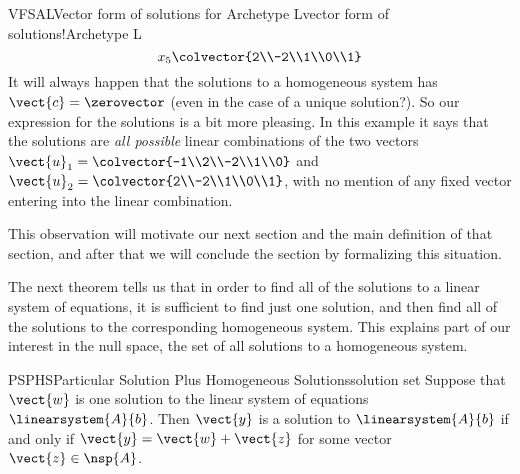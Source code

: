 \begin{example}{VFSAL}{Vector form of solutions for Archetype L}{vector form of solutions!Archetype L}
\begin{equation*}
x_5\colvector{2\\-2\\1\\0\\1}
\end{equation*}
%
It will always happen that the solutions to a homogeneous system has $\vect{c}=\zerovector$ (even in the case of a unique solution?).  So our expression for the solutions is a bit more pleasing.  In this example it says that the solutions are {\em all possible} linear combinations of the two vectors $\vect{u}_1=\colvector{-1\\2\\-2\\1\\0}$ and $\vect{u}_2=\colvector{2\\-2\\1\\0\\1}$, with no mention of any fixed vector entering into the linear combination.\par
%
This observation will motivate our next section and the main definition of that section, and after that we will conclude the section by formalizing this situation.
%
\end{example}
%
%
The next theorem tells us that in order to find all of the solutions to a linear system of equations, it is sufficient to find just one solution, and then find all of the solutions to the corresponding homogeneous system.  This explains part of our interest in the null space, the set of all solutions to a homogeneous system.
%
\begin{theorem}{PSPHS}{Particular Solution Plus Homogeneous Solutions}{solution set}
Suppose that $\vect{w}$ is one solution to the linear system of equations $\linearsystem{A}{b}$.  Then $\vect{y}$ is a solution to $\linearsystem{A}{b}$ if and only if $\vect{y}=\vect{w}+\vect{z}$ for some vector $\vect{z}\in\nsp{A}$.
\end{theorem}
%
